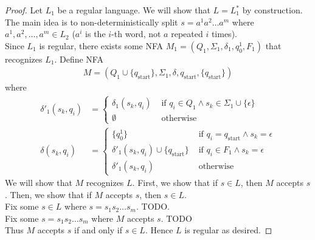 \documentclass{article}
\begin{document}
\begin{proof}
    Let $L_1$ be a regular language. We will show that $L = L_1^*$ by construction. The main idea is to non-deterministically split $s = a^1 a^2 \ldots a^m$ 
    where $a^1, a^2, \ldots, a^m \in L_2$ ($a^{i}$ is the $i$-th word, not $a$ repeated $i$ times). \\

    \noindent
    Since $L_1$ is regular, there exists some NFA $M_1 = (Q_1, \Sigma_1, \delta_1, q_0^1, F_1)$ that recognizes $L_1$. Define NFA
    \begin{align*}
        M = (Q_1 \cup \{ q_{\text{start}} \}, \Sigma_1, \delta, q_{\text{start}}, \{ q_{\text{start}} \})
    \end{align*}
    where
    \begin{align*}
        \delta'_1(s_k, q_i) &= \begin{cases}
            \delta_1(s_k, q_i) & \text{ if } q_i \in Q_1 \land s_k \in \Sigma_1 \cup \{ \epsilon \} \\
            \emptyset & \text{ otherwise}
        \end{cases} \\
        \delta(s_k, q_i) &= \begin{cases}
            \{ q_0^1 \} & \text{ if } q_i = q_{\text{start}} \land s_k = \epsilon \\
            \delta'_1(s_k, q_i) \cup \{ q_{\text{start}} \} & \text{ if } q_i \in F_1 \land s_k = \epsilon \\
            \delta'_1(s_k, q_i) & \text{ otherwise}
        \end{cases}
    \end{align*}
    We will show that $M$ recognizes $L$. First, we show that if $s \in L$, then $M$ accepts $s$. Then, we show that if $M$ accepts $s$, then $s \in L$. \\

    \noindent
    Fix some $s \in L$ where $s = s_1 s_2 \ldots s_m$. TODO. \\

    \noindent
    Fix some $s = s_1 s_2 \ldots s_m$ where $M$ accepts $s$. TODO \\

    \noindent
    Thus $M$ accepts $s$ if and only if $s \in L$. Hence $L$ is regular as desired.
\end{proof}
\end{document}
